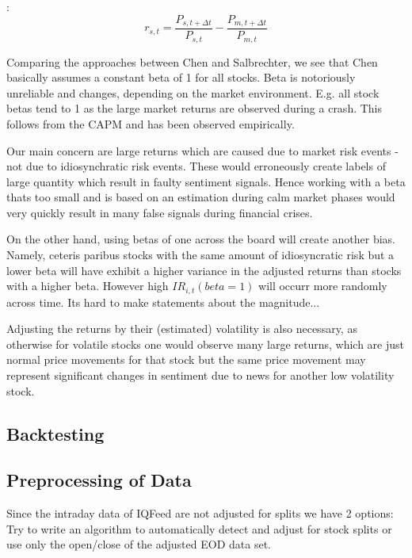 \documentclass[12pt,a4paper]{article}
\begin{document}
	\cite{chen_stock_2021}:
	$$
	r_{s, t}=\frac{P_{s, t+\Delta t}}{P_{s, t}}-\frac{P_{m, t+\Delta t}}{P_{m, t}}
	$$
	
	Comparing the approaches between Chen and Salbrechter, we see that Chen basically assumes a constant beta of 1 for all stocks. 
	Beta is notoriously unreliable and changes, depending on the market environment.
	E.g. all stock betas tend to 1 as the large market returns are observed during a crash.
	This follows from the CAPM and has been observed empirically.
	
	Our main concern are large returns which are caused due to market risk events - not due to idiosynchratic risk events.
	These would erroneously create labels of large quantity which result in faulty sentiment signals.
	Hence working with a beta thats too small and is based on an estimation during calm market phases would very quickly result in many false signals during financial crises.
	
	On the other hand, using betas of one across the board will create another bias.
	Namely, ceteris paribus stocks with the same amount of idiosyncratic risk but a lower beta will have exhibit a higher variance in the adjusted returns than stocks with a higher beta.
	However high $IR_{i,t}(beta=1)$ will occurr more randomly across time.
	Its hard to make statements about the magnitude...
	
	Adjusting the returns by their (estimated) volatility is also necessary, as otherwise for volatile stocks
	one would observe many large returns, which are just normal price movements for that stock but the same price movement may represent significant changes in sentiment due to news for another low volatility stock.
	
	
	
	\subsection{Backtesting}
	
	\subsection{Preprocessing of Data}
	Since the intraday data of IQFeed are not adjusted for splits we have 2 options:
	Try to write an algorithm to automatically detect and adjust for stock splits or
	use only the open/close of the adjusted EOD data set.
	
\end{document}
